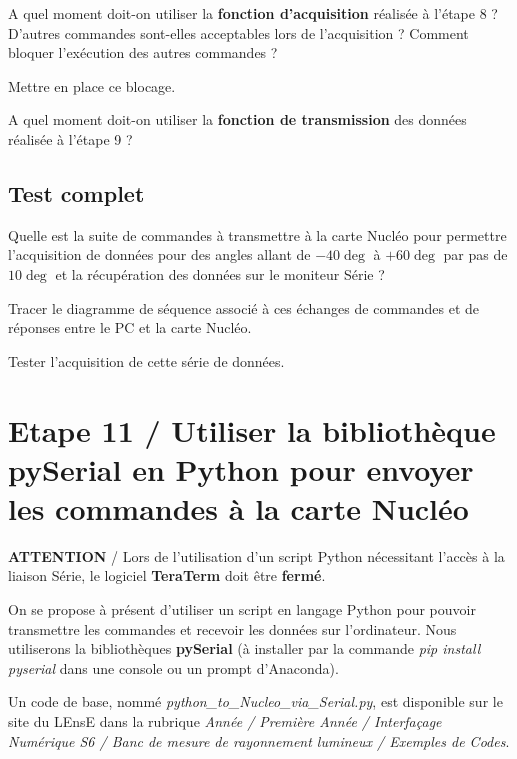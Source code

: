 \documentclass[a4paper,11pt,titlepage]{article} %
\begin{document}
\Quest A quel moment doit-on utiliser la \textbf{fonction d'acquisition} réalisée à l'étape 8 ? D'autres commandes sont-elles acceptables lors de l'acquisition ? Comment bloquer l'exécution des autres commandes ?

\Manip Mettre en place ce blocage.

\Quest A quel moment doit-on utiliser la \textbf{fonction de transmission} des données réalisée à l'étape 9 ?


\subsection{Test complet}

\Quest Quelle est la suite de commandes à transmettre à la carte Nucléo pour permettre l'acquisition de données pour des angles allant de $-40\deg{}$ à $+60\deg{}$ par pas de $10\deg{}$ et la récupération des données sur le moniteur Série ?

\Quest Tracer le diagramme de séquence associé à ces échanges de commandes et de réponses entre le PC et la carte Nucléo.

\Manip Tester l'acquisition de cette série de données.

\newpage
\section{Etape 11 / Utiliser la bibliothèque pySerial en Python pour envoyer les commandes à la carte Nucléo}


\begin{mdframed}[style=sidebar,frametitle={}]
\large
\textbf{ATTENTION} / Lors de l'utilisation d'un script Python nécessitant l'accès à la liaison Série, le logiciel \textbf{TeraTerm} doit être \textbf{fermé}.
\end{mdframed}


\medskip

On se propose à présent d'utiliser un script en langage Python pour pouvoir transmettre les commandes et recevoir les données sur l'ordinateur. Nous utiliserons la bibliothèques \textbf{pySerial} (à installer par la commande \textsl{pip install pyserial} dans une console ou un prompt d'Anaconda).

\medskip

Un code de base, nommé \textsl{python\_to\_Nucleo\_via\_Serial.py}, est disponible sur le site du LEnsE dans la rubrique \textit{Année / Première Année / Interfaçage Numérique S6 / Banc de mesure de rayonnement lumineux / Exemples de Codes}.
\end{document}
